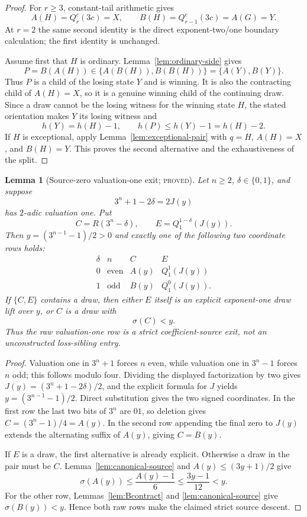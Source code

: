 \documentclass[11pt]{article}
\newtheorem{lemma}[theorem]{Lemma}
\theoremstyle{definition}
\newcommand{\proved}{\textsc{proved}}
\begin{document}
\begin{proof}
For $r\ge3$, constant-tail arithmetic gives
\[
 A(H)=Q_r^e(3c)=X,\qquad
 B(H)=Q_{r-1}^e(3c)=A(G)=Y.
\]
At $r=2$ the same second identity is the direct exponent-two/one boundary
calculation; the first identity is unchanged.

Assume first that $H$ is ordinary.  Lemma~\ref{lem:ordinary-side} gives
\[
 P=B(A(H))\in\{A(B(H)),B(B(H))\}=\{A(Y),B(Y)\}.
\]
Thus $P$ is a child of the losing state $Y$ and is winning.  It is also the
contracting child of $A(H)=X$, so it is a genuine winning child of the
continuing draw.  Since a draw cannot be the losing witness for the winning
state $H$, the stated orientation makes $Y$ its losing witness and
\[
 h(Y)=h(H)-1,\qquad h(P)\le h(Y)-1=h(H)-2.
\]
If $H$ is exceptional, apply Lemma~\ref{lem:exceptional-pair} with
$q=H$, $A(H)=X$, and $B(H)=Y$.  This proves the second alternative and
the exhaustiveness of the split.
\end{proof}

\begin{lemma}[Source-zero valuation-one exit; \proved]
\label{lem:source-zero-j1}
Let $n\ge2$, $\delta\in\{0,1\}$, and suppose
\[
 3^n+1-2\delta=2J(y)
\]
has $2$-adic valuation one.  Put
\[
 C=R(3^n-\delta),\qquad E=Q_1^{1-\delta}(J(y)).
\]
Then $y=(3^{n-1}-1)/2>0$ and exactly one of the following two coordinate
rows holds:
\[
\begin{array}{c|c|c|c}
\delta&n&C&E\\ \hline
0&\text{even}&A(y)&Q_1^1(J(y))\\
1&\text{odd}&B(y)&Q_1^0(J(y)).
\end{array}
\]
If $\{C,E\}$ contains a draw, then either $E$ itself is an explicit
exponent-one draw lift over $y$, or $C$ is a draw with
\[
 \sigma(C)<y.
\]
Thus the raw valuation-one row is a strict coefficient-source exit, not an
unconstructed loss-sibling entry.
\end{lemma}

\begin{proof}
Valuation one in $3^n+1$ forces $n$ even, while valuation one in
$3^n-1$ forces $n$ odd; this follows modulo four.  Dividing the displayed
factorization by two gives $J(y)=(3^n+1-2\delta)/2$, and the explicit
formula for $J$ yields $y=(3^{n-1}-1)/2$.  Direct substitution gives the
two signed coordinates.  In the first row the last two bits of $3^n$ are
$01$, so deletion gives $C=(3^n-1)/4=A(y)$.  In the second row appending
the final zero to $J(y)$ extends the alternating suffix of $A(y)$, giving
$C=B(y)$.

If $E$ is a draw, the first alternative is already explicit.  Otherwise a
draw in the pair must be $C$.  Lemma~\ref{lem:canonical-source} and
$A(y)\le(3y+1)/2$ give
\[
 \sigma(A(y))\le\frac{A(y)-1}{6}
 \le\frac{3y-1}{12}<y.
\]
For the other row, Lemmas~\ref{lem:Bcontract} and
\ref{lem:canonical-source} give $\sigma(B(y))<y$.  Hence both raw rows make
the claimed strict source descent.
\end{proof}
\end{document}
